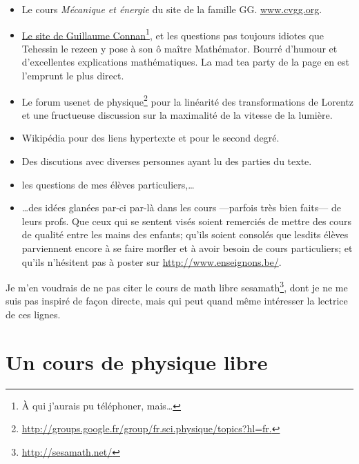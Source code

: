 \documentclass[a4paper,12pt]{book}
\theoremstyle{mes_exemples}	\newtheorem{exemple}[numtho]{Exemple}
\theoremstyle{mes_tho}
\begin{document}
\begin{itemize}
	\item
		Le cours \emph{Mécanique et énergie} du \og site de la famille GG\fg. \href{www.cvgg.org}{www.cvgg.org}.
	\item 
		\href{http://gconnan.free.fr/}{Le site de Guillaume Connan}\footnote{À qui j'aurais pu téléphoner, mais\ldots}, et les questions pas toujours idiotes que Tehessin le rezeen y pose à son ô maître Mathémator. Bourré d'humour et d'excellentes explications mathématiques. La mad tea party de la page \pageref{PgMadTeaParty} en est l'emprunt le plus direct.
	\item 
		Le forum usenet de physique\footnote{\href{http://groups.google.fr/group/fr.sci.physique/topics?hl=fr.}{http://groups.google.fr/group/fr.sci.physique/topics?hl=fr.}} pour la linéarité des transformations de Lorentz et une fructueuse discussion sur la maximalité de la vitesse de la lumière. 
	\item 
		Wikipédia pour des liens hypertexte et pour le second degré.
	\item 
		Des discutions avec diverses personnes ayant lu des parties du texte.
	\item 
		les questions de mes élèves particuliers,\ldots
	\item 
		\ldots des idées glanées par-ci par-là dans les cours ---parfois très bien faits--- de leurs profs. Que ceux qui se sentent visés soient remerciés de mettre des cours de qualité entre les mains des enfants; qu'ils soient consolés que lesdits élèves parviennent encore à se faire morfler et à avoir besoin de cours particuliers; et qu'ils n'hésitent pas à poster sur \href{http://www.enseignons.be/}{http://www.enseignons.be/}.
\end{itemize}

Je m'en voudrais de ne pas citer le cours de math libre sesamath\footnote{\href{http://manuel.sesamath.net/}{http://sesamath.net/}}, dont je ne me suis pas inspiré de façon directe, mais qui peut quand même intéresser la lectrice de ces lignes.


					\section{Un cours de physique libre}
\end{document}
